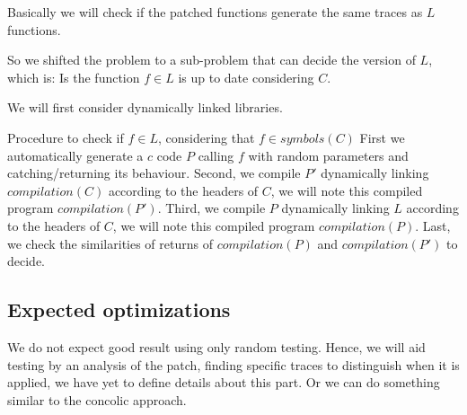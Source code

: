 \documentclass{article}
\newcommand{\symb}{{symbols}}
\newcommand{\comp}{{compilation}}
\begin{document}
    Basically we will check if the patched functions generate the same traces
    as $L$ functions.


    So we shifted the problem to a sub-problem that can decide the version of
    $L$, which is: Is the function $f \in L$ is up to date considering $C$.

    We will first consider dynamically linked libraries.

    Procedure to check if $f \in L$, considering that $f \in \symb(C)$
    First we automatically generate a $c$ code $P$ calling $f$ with random
    parameters and catching/returning its behaviour. 
    Second, we compile $P'$ dynamically linking $\comp(C)$ according to the
    headers of $C$, we will note this compiled program $\comp(P')$. 
    Third, we compile $P$ dynamically linking $L$ according to the headers of
    $C$, we will note this compiled program $\comp(P)$. 
    Last, we check the similarities of returns of $\comp(P)$ and $\comp(P')$
    to decide.

    \subsection{Expected optimizations}
    We do not expect good result using only random testing. Hence, we will aid
    testing by an analysis of the patch, finding specific traces to
    distinguish when it is applied, we have yet to define details about this
    part. 
    Or we can do something similar to the concolic approach.
\end{document}

